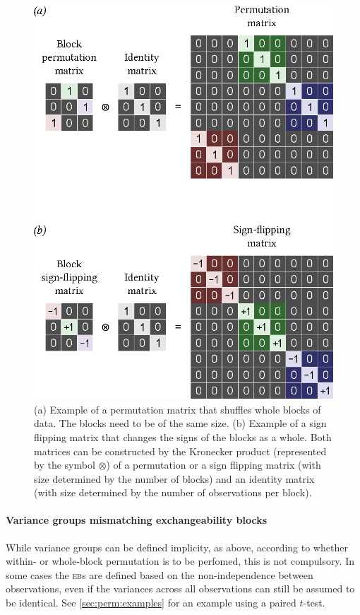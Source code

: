 \begin{figure}[!p]
\centering
\includegraphics{images/whole-block.eps}
\caption[Example of permutation and sign flipping matrix for whole-block exchangeability]{(a) Example of a permutation matrix that shuffles whole blocks of data. The blocks need to be of the same size. (b) Example of a sign flipping matrix that changes the signs of the blocks as a whole. Both matrices can be constructed by the Kronecker product (represented by the symbol $\otimes$) of a permutation or a sign flipping matrix (with size determined by the number of blocks) and an identity matrix (with size determined by the number of observations per block).}
\label{fig:whole-block}
\end{figure}

\paragraph{Variance groups mismatching exchangeability blocks} While variance groups can be defined implicity, as above, according to whether within- or whole-block permutation is to be perfomed, this is not compulsory. In some cases the \textsc{eb}s are defined based on the non-independence between observations, even if the variances across all observations can still be assumed to be identical. See \ref{sec:perm:examples} for an example using a paired $t$-test.

